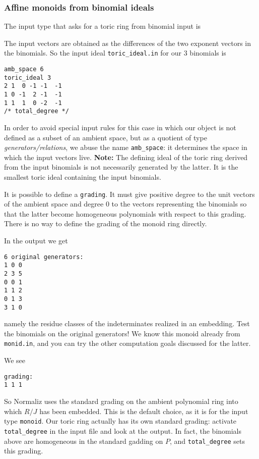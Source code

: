 \subsubsection{Affine monoids from binomial ideals}\label{toric_ideal}
The input type that asks for a toric ring from binomial input is
\begin{itemize}
\end{itemize}
The input vectors are obtained as the differences of the two exponent vectors in the binomials. So the input ideal \verb+toric_ideal.in+ for our $3$ binomials is
\begin{Verbatim}
amb_space 6
toric_ideal 3
2 1  0 -1 -1  -1
1 0 -1  2 -1  -1
1 1  1  0 -2  -1
/* total_degree */
\end{Verbatim}
In order to avoid special input rules for this case in which our object is not defined as a subset of an ambient space, but as a quotient of type \emph{generators/relations}, we abuse the name \verb|amb_space|: it determines the space in which the input vectors live. \textbf{Note:} \enspace The defining ideal of the toric ring derived from the input binomials is not necessarily generated by the latter. It is the smallest toric ideal containing the input binomials.

It is possible to define a \verb|grading|. It must give positive degree to the unit vectors of the ambient space and degree $0$ to the vectors representing the binomials so that the latter become homogeneous polynomials with respect to this grading. There is no way to define the grading of the monoid ring directly.

In the output we get
\begin{Verbatim}
6 original generators:
1 0 0
2 3 5
0 0 1
1 1 2
0 1 3
3 1 0
\end{Verbatim}
namely the residue classes of the indeterminates realized in an embedding. Test the binomials on the original generators! We know this monoid already from \verb|monid.in|, and you can try the other computation goals discussed for the latter.

We see
\begin{Verbatim}
grading:
1 1 1 
\end{Verbatim}
So Normaliz uses the standard grading on the ambient polynomial ring into which $R/J$ has been embedded. This is the default choice, as it is for the input type \verb|monoid|. Our toric ring actually has its own standard grading: activate \verb|total_degree| in the input file and look at the output. In fact, the binomials above are homogeneous in the standard gadding on $P$, and \verb|total_degree| sets this grading.

